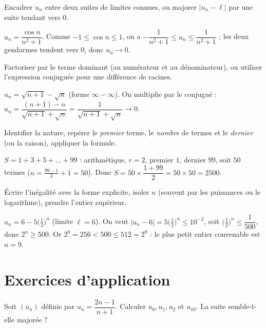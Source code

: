 Encadrer $u_n$ entre deux suites de limites connues, ou majorer $|u_n-\ell|$ par une suite tendant vers $0$.
\begin{exemple}
$u_n=\dfrac{\cos n}{n^2+1}$. Comme $-1\le\cos n\le1$, on a $-\dfrac1{n^2+1}\le u_n\le\dfrac1{n^2+1}$ ;
les deux gendarmes tendent vers $0$, donc $u_n\to0$.
\end{exemple}

Factoriser par le terme dominant (au numérateur et au dénominateur), ou utiliser l'expression conjuguée pour une différence de racines.
\begin{exemple}
$u_n=\sqrt{n+1}-\sqrt n$ (forme $\infty-\infty$). On multiplie par le conjugué :
$u_n=\dfrac{(n+1)-n}{\sqrt{n+1}+\sqrt n}=\dfrac1{\sqrt{n+1}+\sqrt n}\to0$.
\end{exemple}

Identifier la nature, repérer le \emph{premier} terme, le \emph{nombre} de termes et le \emph{dernier} (ou la raison), appliquer la formule.
\begin{exemple}
$S=1+3+5+\dots+99$ : arithmétique, $r=2$, premier $1$, dernier $99$, soit $50$ termes
($n=\frac{99-1}{2}+1=50$). Donc $S=50\times\dfrac{1+99}{2}=50\times50=2500$.
\end{exemple}

Écrire l'inégalité avec la forme explicite, isoler $n$ (souvent par les puissances ou le logarithme), prendre l'entier supérieur.
\begin{exemple}
$u_n=6-5\bigl(\tfrac12\bigr)^n$ (limite $\ell=6$). On veut $|u_n-6|=5\bigl(\tfrac12\bigr)^n\le10^{-2}$,
soit $\bigl(\tfrac12\bigr)^n\le\dfrac{1}{500}$, donc $2^n\ge500$. Or $2^8=256<500\le512=2^9$ :
le plus petit entier convenable est $n=9$.
\end{exemple}

\section{Exercices d'application}

\exo{} Soit $(u_n)$ définie par $u_n=\dfrac{2n-1}{n+1}$. Calculer $u_0,u_1,u_2$ et $u_{10}$.
La suite semble-t-elle majorée ?

